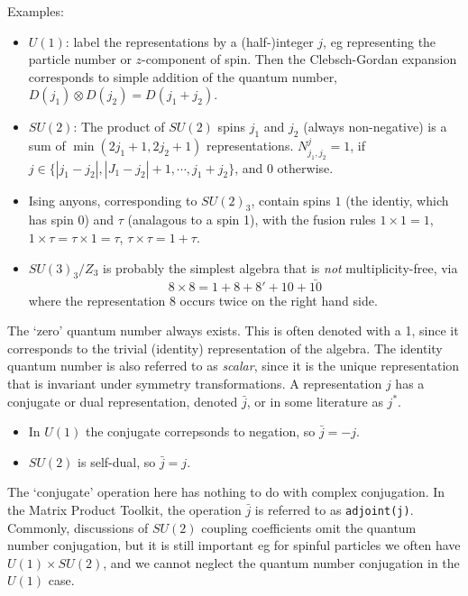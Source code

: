 \documentclass[12pt]{article}
\begin{document}
Examples:
\begin{itemize}
\item $U(1)$: label the representations by a (half-)integer $j$, eg representing
the particle number or $z$-component of spin. Then the Clebsch-Gordan
expansion corresponds to simple addition of the quantum number, $D(j_1) \otimes D(j_2) = D(j_1+j_2)$.
\item $SU(2)$: The product of $SU(2)$ spins $j_1$ and $j_2$ (always non-negative) 
is a sum of $\min(2j_1+1,2j_2+1)$
representations. $N^{j}_{j_1,j_2} = 1$, if 
$j \in \{|j_1 - j_2|, |J_1 - j_2| + 1, \cdots, j_1+j_2\}$,
and $0$ otherwise.
\item Ising anyons, corresponding to $SU(2)_3$, contain spins $1$ (the identiy,
which has spin 0) and $\tau$ (analagous to a spin 1), with the
fusion rules $1 \times 1 = 1$, $1 \times \tau = \tau \times 1 = \tau$, $\tau \times \tau = 1 + \tau$.
\item $SU(3)_3 / Z_3$ is probably the simplest algebra that is \emph{not} 
multiplicity-free\cite{Ardonne}, via
\begin{equation}
8 \times 8 = 1 + 8 + 8' + 10 + \bar{10}
\end{equation}
where the representation $8$ occurs twice on the right hand side.

\end{itemize}

The `zero' quantum number always exists. This is often denoted with a 1, since it corresponds
to the trivial (identity) representation of the algebra. 
The identity quantum number is also referred to as \emph{scalar}, since it is
the unique representation that is invariant under symmetry transformations.
A representation $j$ has a conjugate or dual representation, denoted $\bar{j}$,
or in some literature as $j^*$.
\begin{itemize}
\item In $U(1)$ the conjugate correpsonds to negation, so $\bar{j} = -j$.
\item $SU(2)$ is self-dual, so $\bar{j} = j$.
\end{itemize}
The `conjugate' operation here has nothing to do with complex conjugation.  In the Matrix
Product Toolkit, the operation $\bar{j}$ is referred to as \texttt{adjoint(j)}.
Commonly, discussions of $SU(2)$ coupling coefficients omit the quantum number conjugation,
but it is still important eg for spinful particles we often have $U(1)\times SU(2)$, and
we cannot neglect the quantum number conjugation in the $U(1)$ case.
\end{document}
